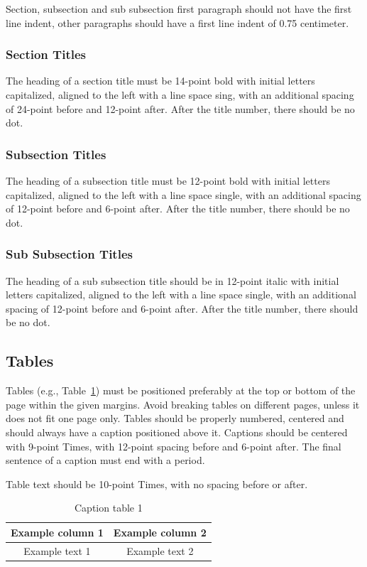 \documentclass[english,brazilian]{RBIEarticle} %
\begin{document}
Section, subsection and sub subsection first paragraph should not have the first line indent, other paragraphs should have a first line indent of 0.75 centimeter.


\subsubsection{Section Titles}
The heading of a section title must be 14-point bold with initial letters capitalized, aligned to the left with a line space sing, with an additional spacing of 24-point before and 12-point after. After the title number, there should be no dot.


\subsubsection{Subsection Titles}
The heading of a subsection title must be 12-point bold with initial letters capitalized, aligned to the left with a line space single, with an additional spacing of 12-point before and 6-point after. After the title number, there should be no dot.


\subsubsection{Sub Subsection Titles}
The heading of a sub subsection title should be in 12-point italic with initial letters capitalized, aligned to the left with a line space single, with an additional spacing of 12-point before and 6-point after. After the title number, there should be no dot.


\subsection{Tables}
Tables (e.g., Table~\ref{tab:one}) must be positioned preferably at the top or bottom of the page within the given margins. Avoid breaking tables on different pages, unless it does not fit one page only. Tables should be properly numbered, centered and should always have a caption positioned above it. Captions should be centered with 9-point Times, with 12-point spacing before and 6-point after. The final sentence of a caption must end with a period.

Table text should be 10-point Times, with no spacing before or after.

\begin{table}[h]
	\caption{Caption table 1}
	\label{tab:one}
	\centering\footnotesize%
	\begin{tabular}{|c|c|}
		\hline
		\rowcolor{gray} \textbf{Example column 1} & \textbf{Example column 2}\\
		\hline
		Example text 1 & Example text 2\\
		\hline
	\end{tabular}
\end{table}
\end{document}

